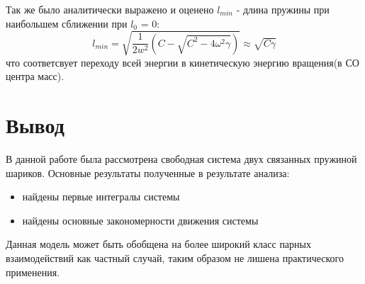 \documentclass[a4paper, 12pt]{article}
\begin{document}
    Так же было аналитически выражено и оценено $l_{min}$ - длина пружины при наибольшем сближении при $l_0$ = 0:
    \[l_{min} = \sqrt{\frac{1}{2w^2}(C - \sqrt{C^2 - 4\omega^2 \gamma})} \approx \sqrt{C\gamma}\]
    что соответсвует переходу всей энергии в кинетическую энергию вращения(в СО центра масс).

    
    \newpage
    
 \section{Вывод}
 В данной работе была рассмотрена свободная система двух связанных пружиной шариков.
 Основные результаты полученные в результате анализа:
 \begin{itemize}
    \item найдены первые интегралы системы
    \item найдены основные закономерности движения системы
 \end{itemize}
 Данная модель может быть обобщена на более широкий класс парных взаимодействий как частный случай, таким образом не лишена практического применения.
\end{document}
